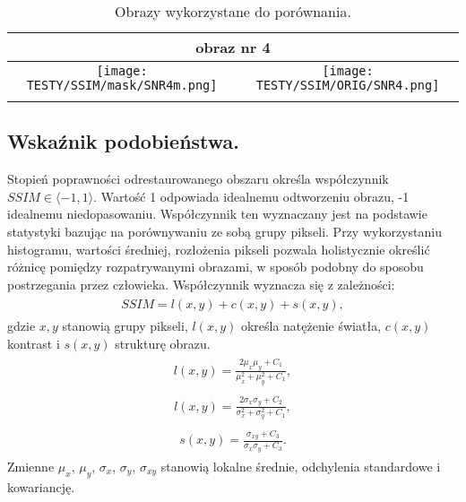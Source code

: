 \documentclass[a4paper,12pt,twoside,openany]{report}
\def \SNRIV{obraz nr 4}
\begin{document}
\begin{longtable}[h!]{|c|c|}
    \multicolumn{2}{|c|}{
		\SNRIV
    } \\ \hline 
    \begin{minipage}{0.5\textwidth}
    \vspace{0.2cm}
    \centering
    \texttt{[image: TESTY/SSIM/mask/SNR4m.png]}
    \vspace{0.2cm}
    \end{minipage}
	&
    \begin{minipage}{0.5\textwidth}
    \vspace{0.2cm}
    \centering
    \texttt{[image: TESTY/SSIM/ORIG/SNR4.png]}
    \vspace{0.2cm}
    \end{minipage}\\ \hline
    \caption{Obrazy wykorzystane do porównania.}
	\label{COMPAREIMAGES}
\end{longtable}
\subsection{Wskaźnik podobieństwa.}
Stopień poprawności odrestaurowanego obszaru określa współczynnik $SSIM \in \langle -1,1 \rangle$. Wartość 1 odpowiada idealnemu odtworzeniu obrazu, -1 idealnemu niedopasowaniu. Współczynnik ten wyznaczany jest na podstawie statystyki bazując na porównywaniu ze sobą grupy pikseli. Przy wykorzystaniu histogramu, wartości średniej, rozłożenia pikseli pozwala holistycznie określić różnicę pomiędzy rozpatrywanymi obrazami, w sposób podobny do sposobu  postrzegania przez człowieka. Współczynnik wyznacza się z zależności:
\begin{align}
\begin{aligned}
SSIM = l(x,y) + c(x,y) + s(x,y),
\end{aligned}
\end{align}
gdzie $x,y$ stanowią grupy pikseli, $l(x,y)$ określa natężenie światła, $c(x,y)$ kontrast i $s(x,y)$ strukturę obrazu.
\begin{align}
\begin{aligned}
l(x,y) = \frac{2 \mu_x \mu_y + C_1}{\mu^2_x + \mu^2_y + C_1},
\end{aligned}
\end{align}
\begin{align}
\begin{aligned}
l(x,y) = \frac{2 \sigma_x \sigma_y + C_2}{\sigma^2_x + \sigma^2_y + C_1},
\end{aligned}
\end{align}
\begin{align}
\begin{aligned}
s(x,y) = \frac{\sigma_{xy} + C_3}{\sigma_{x}\sigma_{y}+C_3}.
\end{aligned}
\end{align}
Zmienne $\mu_x$, $\mu_y$, $\sigma_{x}$, $\sigma_{y}$, $\sigma_{xy}$ stanowią lokalne średnie, odchylenia standardowe i kowariancję.
\end{document}
